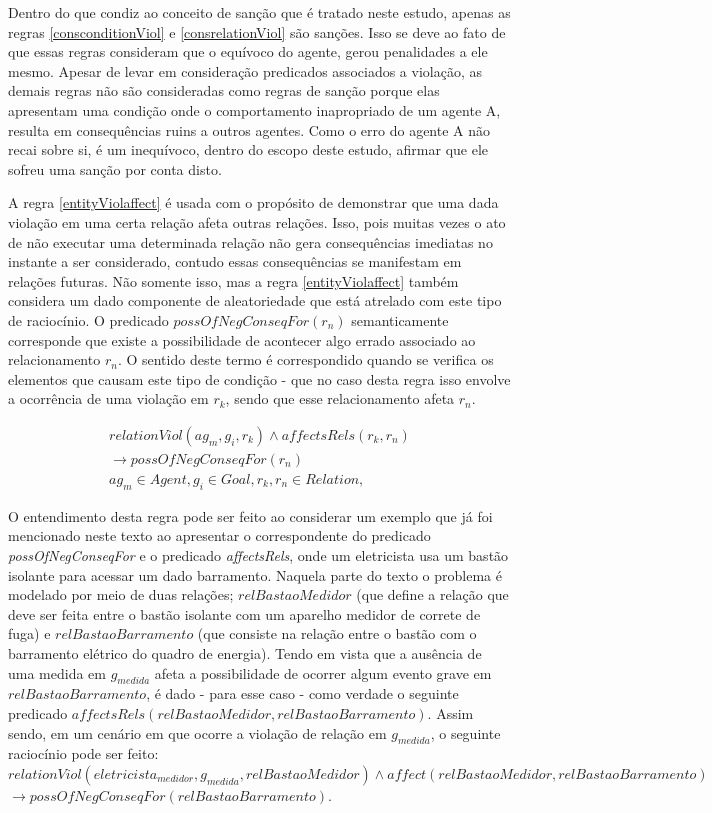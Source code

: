 Dentro do que condiz ao conceito de sanção que é tratado neste estudo, apenas as regras \ref{consconditionViol} e \ref{consrelationViol} são sanções. Isso se deve ao fato de que essas regras consideram que o equívoco do agente, gerou penalidades a ele mesmo. Apesar de levar em consideração predicados associados a violação, as demais regras não são consideradas como regras de sanção porque elas apresentam uma condição onde o comportamento inapropriado de um agente A, resulta em consequências ruins a outros agentes. Como o erro do agente A não recai sobre si, é um inequívoco, dentro do escopo deste estudo, afirmar que ele sofreu uma sanção por conta disto. 


A regra \ref{entityViolaffect} é usada com o propósito de demonstrar que uma dada violação em uma certa relação afeta outras relações. Isso, pois muitas vezes o ato de não executar uma determinada relação não gera consequências imediatas no instante a ser considerado, contudo essas consequências se manifestam em relações futuras. Não somente isso, mas a regra \ref{entityViolaffect} também considera um dado componente de aleatoriedade que está atrelado com este tipo de raciocínio. O predicado $possOfNegConseqFor(r_n)$ semanticamente corresponde que existe a possibilidade de acontecer algo errado associado ao relacionamento $r_n$. O sentido deste termo é correspondido quando se verifica os elementos que causam este tipo de condição - que no caso desta regra isso envolve a ocorrência de uma violação em $r_k$, sendo que esse relacionamento afeta $r_n$.

\begin{eqnarray}\label{entityViolaffect}
	relationViol(ag_m,g_i,r_k) \wedge affectsRels(r_k,r_n) \nonumber \\
    \to possOfNegConseqFor(r_n)  \nonumber \\
    ag_m \in Agent, g_i \in Goal, r_k,r_n \in Relation, 
\end{eqnarray}

O entendimento desta regra pode ser feito ao considerar um exemplo que já foi mencionado neste texto ao apresentar o correspondente do predicado \textit{possOfNegConseqFor} e o predicado \textit{affectsRels}, onde um eletricista usa um bastão isolante para acessar um dado barramento. Naquela parte do texto o problema é modelado por meio de duas relações; $relBastaoMedidor$ (que define a relação que deve ser feita entre o bastão isolante com um aparelho medidor de correte de fuga) e $relBastaoBarramento$ (que consiste na relação entre o bastão com o barramento elétrico do quadro de energia). Tendo em vista que a ausência de uma medida em $g_{medida}$ afeta a possibilidade de ocorrer algum evento grave em $relBastaoBarramento$, é dado - para esse caso - como verdade o seguinte predicado $affectsRels(relBastaoMedidor, relBastaoBarramento)$. Assim sendo, em um cenário em que ocorre a violação de relação em $g_{medida}$, o seguinte raciocínio pode ser feito: $relationViol(eletricista_{medidor},g_{medida},relBastaoMedidor) \wedge affect(relBastaoMedidor, relBastaoBarramento) $ \\ $\to  possOfNegConseqFor(relBastaoBarramento)$.   

